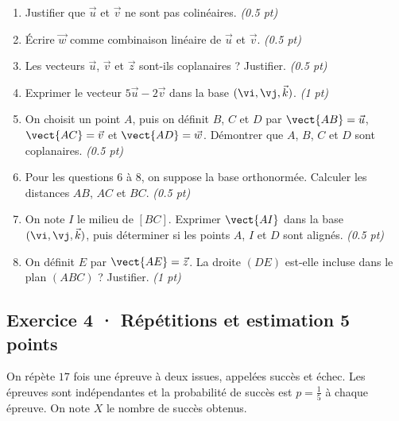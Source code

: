 \begin{enumerate}

\item Justifier que $\vec u$ et $\vec v$ ne sont pas colinéaires. \hfill\textit{(\num{0,5} pt)}

\item Écrire $\vec w$ comme combinaison linéaire de $\vec u$ et $\vec v$. \hfill\textit{(\num{0,5} pt)}

\item Les vecteurs $\vec u$, $\vec v$ et $\vec z$ sont-ils coplanaires ? Justifier. \hfill\textit{(\num{0,5} pt)}

\item Exprimer le vecteur $5\vec u-2\vec v$ dans la base $(\vi,\vj,\vec k)$. \hfill\textit{(1 pt)}

\item On choisit un point $A$, puis on définit $B$, $C$ et $D$ par $\vect{AB}=\vec u$, $\vect{AC}=\vec v$ et $\vect{AD}=\vec w$. Démontrer que $A$, $B$, $C$ et $D$ sont coplanaires. \hfill\textit{(\num{0,5} pt)}

\item Pour les questions 6 à 8, on suppose la base orthonormée. Calculer les distances $AB$, $AC$ et $BC$. \hfill\textit{(\num{0,5} pt)}

\item On note $I$ le milieu de $[BC]$. Exprimer $\vect{AI}$ dans la base $(\vi,\vj,\vec k)$, puis déterminer si les points $A$, $I$ et $D$ sont alignés. \hfill\textit{(\num{0,5} pt)}

\item On définit $E$ par $\vect{AE}=\vec z$. La droite $(DE)$ est-elle incluse dans le plan $(ABC)$ ? Justifier. \hfill\textit{(1 pt)}

\end{enumerate}

\subsection*{Exercice 4 · Répétitions et estimation \hfill 5 points}On répète $17$ fois une épreuve à deux issues, appelées succès et échec. Les épreuves sont indépendantes et la probabilité de succès est $p=\frac{1}{5}$ à chaque épreuve. On note $X$ le nombre de succès obtenus.

